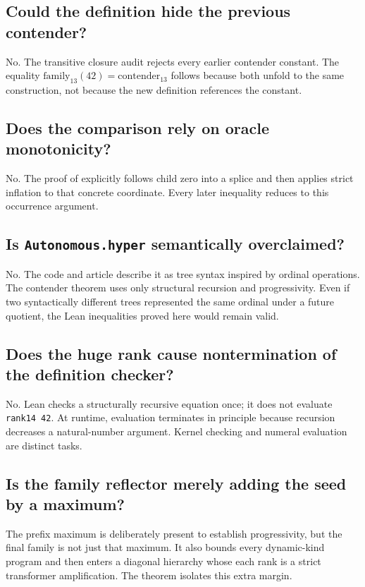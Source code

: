\documentclass[11pt]{article}
\theoremstyle{definition}
\newcommand{\code}[1]{\texttt{#1}}
\begin{document}
\subsection{Could the definition hide the previous contender?}
No.  The transitive closure audit rejects every earlier contender constant.  The equality \(\mathrm{family}_{13}(42)=\mathrm{contender}_{13}\) follows because both unfold to the same construction, not because the new definition references the constant.

\subsection{Does the comparison rely on oracle monotonicity?}
No.  The proof of  explicitly follows child zero into a splice and then applies strict inflation to that concrete coordinate.  Every later inequality reduces to this occurrence argument.

\subsection{Is \code{Autonomous.hyper} semantically overclaimed?}
No.  The code and article describe it as tree syntax inspired by ordinal operations.  The contender theorem uses only structural recursion and progressivity.  Even if two syntactically different trees represented the same ordinal under a future quotient, the Lean inequalities proved here would remain valid.

\subsection{Does the huge rank cause nontermination of the definition checker?}
No.  Lean checks a structurally recursive equation once; it does not evaluate \code{rank14 42}.  At runtime, evaluation terminates in principle because recursion decreases a natural-number argument.  Kernel checking and numeral evaluation are distinct tasks.

\subsection{Is the family reflector merely adding the seed by a maximum?}
The prefix maximum is deliberately present to establish progressivity, but the final family is not just that maximum.  It also bounds every dynamic-kind program and then enters a diagonal hierarchy whose each rank is a strict transformer amplification.  The theorem  isolates this extra margin.
\end{document}
